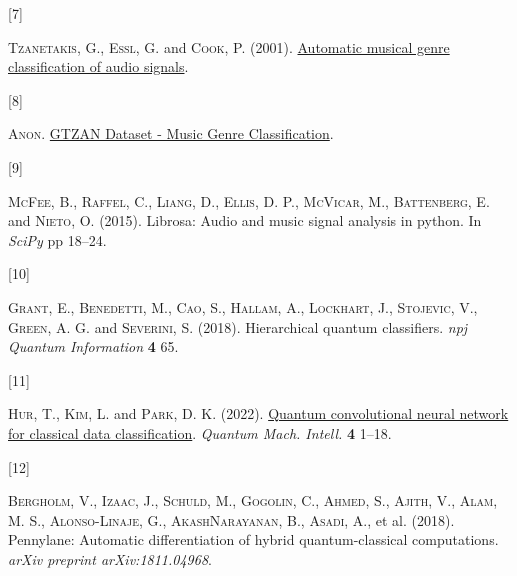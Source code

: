 \documentclass[
  13pt,
  a4paper,
  DIV=11,
  numbers=noendperiod]{scrreprt}
\newlength{\cslhangindent}
\newlength{\csllabelwidth}
\newenvironment{CSLReferences}[2] %
 {\begin{list}{}{%
  \setlength{\itemindent}{0pt}
  \setlength{\leftmargin}{0pt}
  \setlength{\parsep}{0pt}
  \ifodd #1
   \setlength{\leftmargin}{\cslhangindent}
   \setlength{\itemindent}{-1\cslhangindent}
  \fi
  \setlength{\itemsep}{#2\baselineskip}}}
 {\end{list}}
\newcommand{\CSLLeftMargin}[1]{\parbox[t]{\csllabelwidth}{\strut#1\strut}}
\newcommand{\CSLRightInline}[1]{\parbox[t]{\linewidth - \csllabelwidth}{\strut#1\strut}}
\begin{document}
\begin{CSLReferences}{0}{1}
\CSLLeftMargin{{[}7{]} }%
\CSLRightInline{\textsc{Tzanetakis}, G., \textsc{Essl}, G. and
\textsc{Cook}, P. (2001).
\href{http://ismir2001.ismir.net/pdf/tzanetakis.pdf}{Automatic musical
genre classification of audio signals}.}

\CSLLeftMargin{{[}8{]} }%
\CSLRightInline{\textsc{Anon}.
\href{https://www.kaggle.com/datasets/andradaolteanu/gtzan-dataset-music-genre-classification?resource=download}{{GTZAN
Dataset - Music Genre Classification}}.}

\CSLLeftMargin{{[}9{]} }%
\CSLRightInline{\textsc{McFee}, B., \textsc{Raffel}, C., \textsc{Liang},
D., \textsc{Ellis}, D. P., \textsc{McVicar}, M., \textsc{Battenberg}, E.
and \textsc{Nieto}, O. (2015). Librosa: Audio and music signal analysis
in python. In \emph{SciPy} pp 18--24.}

\CSLLeftMargin{{[}10{]} }%
\CSLRightInline{\textsc{Grant}, E., \textsc{Benedetti}, M.,
\textsc{Cao}, S., \textsc{Hallam}, A., \textsc{Lockhart}, J.,
\textsc{Stojevic}, V., \textsc{Green}, A. G. and \textsc{Severini}, S.
(2018). Hierarchical quantum classifiers. \emph{npj Quantum Information}
\textbf{4} 65.}

\CSLLeftMargin{{[}11{]} }%
\CSLRightInline{\textsc{Hur}, T., \textsc{Kim}, L. and \textsc{Park}, D.
K. (2022). \href{https://doi.org/10.1007/s42484-021-00061-x}{{Quantum
convolutional neural network for classical data classification}}.
\emph{Quantum Mach. Intell.} \textbf{4} 1--18.}

\CSLLeftMargin{{[}12{]} }%
\CSLRightInline{\textsc{Bergholm}, V., \textsc{Izaac}, J.,
\textsc{Schuld}, M., \textsc{Gogolin}, C., \textsc{Ahmed}, S.,
\textsc{Ajith}, V., \textsc{Alam}, M. S., \textsc{Alonso-Linaje}, G.,
\textsc{AkashNarayanan}, B., \textsc{Asadi}, A., et al. (2018).
Pennylane: Automatic differentiation of hybrid quantum-classical
computations. \emph{arXiv preprint arXiv:1811.04968}.}

\end{CSLReferences}
\end{document}

